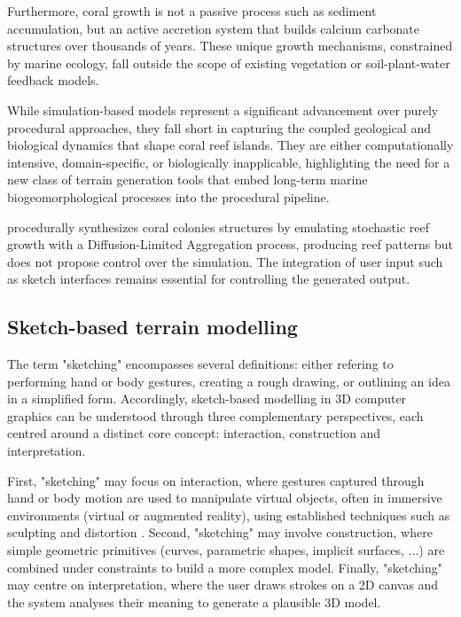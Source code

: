 Furthermore, coral growth is not a passive process such as sediment accumulation, but an active accretion system that builds calcium carbonate structures over thousands of years. These unique growth mechanisms, constrained by marine ecology, fall outside the scope of existing vegetation or soil-plant-water feedback models.

\midConclusion

While simulation-based models represent a significant advancement over purely procedural approaches, they fall short in capturing the coupled geological and biological dynamics that shape coral reef islands. They are either computationally intensive, domain-specific, or biologically inapplicable, highlighting the need for a new class of terrain generation tools that embed long-term marine biogeomorphological processes into the procedural pipeline.

\cite{Li2021} procedurally synthesizes coral colonies structures by emulating stochastic reef growth with a Diffusion-Limited Aggregation process, producing reef patterns but does not propose control over the simulation. The integration of user input such as sketch interfaces remains essential for controlling the generated output.


\subsection{Sketch-based terrain modelling}
\label{sec:coral-island-sota-sketches}

The term "sketching" encompasses several definitions: either refering to performing hand or body gestures, creating a rough drawing, or outlining an idea in a simplified form. Accordingly, sketch-based modelling in 3D computer graphics can be understood through three complementary perspectives, each centred around a distinct core concept: interaction, construction and interpretation.

First, "sketching" may focus on interaction, where gestures captured through hand or body motion are used to manipulate virtual objects, often in immersive environments (virtual or augmented reality), using established techniques such as sculpting and distortion \cite{Olsen2009, Cook2009}. Second, "sketching" may involve construction, where simple geometric primitives (curves, parametric shapes, implicit surfaces, ...) are combined under constraints to build a more complex model. Finally, "sketching" may centre on interpretation, where the user draws strokes on a 2D canvas and the system analyses their meaning to generate a plausible 3D model.

